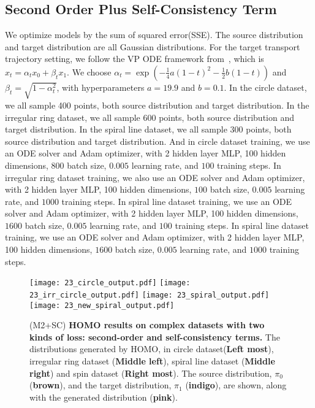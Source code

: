 \subsection{Second Order Plus Self-Consistency Term}\label{sec:app:second_third}
We optimize models by the sum of squared error(SSE). The source distribution and target distribution are all Gaussian distributions. For the target transport trajectory setting, we follow the VP ODE framework from~\cite{rectified_flow}, which is $x_t = \alpha_t x_0 + \beta_t x_1$. We choose $\alpha_t = \exp(-\frac{1}{4} a(1-t)^2 - \frac{1}{2} b(1-t))$ and $\beta_t = \sqrt{1 - \alpha_t^2}$, with hyperparameters $a = 19.9$ and $b = 0.1$. In the circle dataset, we all sample 400 points, both source distribution and target distribution. In the irregular ring dataset, we all sample 600 points, both source distribution and target distribution. In the spiral line dataset, we all sample 300 points, both source distribution and target distribution. And in circle dataset training, we use an ODE solver and Adam optimizer, with 2 hidden layer MLP, 100 hidden dimensions, $800$ batch size, $0.005$ learning rate, and $100$ training steps. In irregular ring dataset training, we also use an ODE solver and Adam optimizer, with 2 hidden layer MLP, 100 hidden dimensions, $100$ batch size, $0.005$ learning rate, and $1000$ training steps. In spiral line dataset training, we use an ODE solver and Adam optimizer, with 2 hidden layer MLP, 100 hidden dimensions, $1600$ batch size, $0.005$ learning rate, and $100$ training steps. In spiral line dataset training, we use an ODE solver and Adam optimizer, with 2 hidden layer MLP, 100 hidden dimensions, $1600$ batch size, $0.005$ learning rate, and $1000$ training steps. 
\begin{figure}[!ht]
\centering
\texttt{[image: 23\_circle\_output.pdf]}
\texttt{[image: 23\_irr\_circle\_output.pdf]}
\texttt{[image: 23\_spiral\_output.pdf]}
\texttt{[image: 23\_new\_spiral\_output.pdf]}
\caption{
(M2+SC) \textbf{HOMO results on complex datasets with two kinds of loss: second-order and self-consistency terms.} The distributions generated by HOMO,
in circle dataset(\textbf{Left most}), irregular ring dataset (\textbf{Middle left}), spiral line dataset (\textbf{Middle right}) and spin dataset (\textbf{Right most}). 
The source distribution, $\pi_0$ ({\textbf{brown}}), and the target distribution, $\pi_1$ ({\textbf{indigo}}), are shown, along with the generated distribution ({\textbf{pink}}). }
\label{fig:m2_sc_appendix}
\end{figure}

